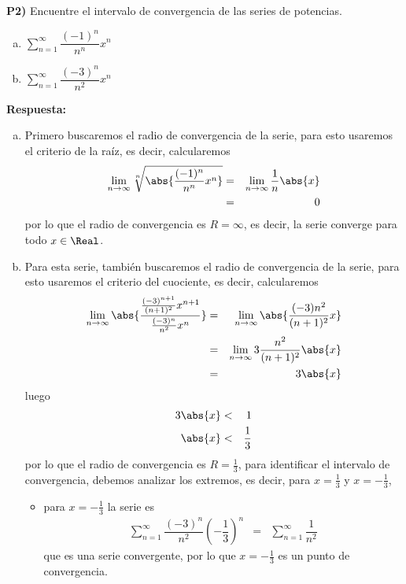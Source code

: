 \documentclass{article}
\begin{document}
\newpage
\noindent\textbf{P2) } Encuentre el intervalo de convergencia de las series de potencias.
\begin{enumerate}[a)]
  \item $\displaystyle\sum_{n=1}^{\infty}\dfrac{(-1)^n}{n^n}x^n$
  \item $\displaystyle\sum_{n=1}^{\infty}\dfrac{(-3)^n}{n^2}x^n$
\end{enumerate}

\vspace{2mm}
\noindent\textbf{Respuesta:} 
\begin{enumerate}[a)]
  \item Primero buscaremos el radio de convergencia de la serie, para esto usaremos el criterio de la raíz, es decir, calcularemos
  \begin{eqnarray*}
    \lim_{n\to\infty}\sqrt[n]{\abs{\dfrac{(-1)^n}{n^n}x^n}}
      &=& \lim_{n\to\infty}\dfrac{1}{n}\abs{x}\\
      &=& 0
  \end{eqnarray*}
  por lo que el radio de convergencia es $R=\infty$, es decir, la serie converge para todo $x\in\Real$.
  \item Para esta serie, también buscaremos el radio de convergencia de la serie, para esto usaremos el criterio del cuociente, es decir, calcularemos
  \begin{eqnarray*}
    \lim_{n\to\infty}\abs{\dfrac{\frac{(-3)^{n+1}}{(n+1)^2}x^{n+1}}{\frac{(-3)^n}{n^2}x^n}}
      &=& \lim_{n\to\infty}\abs{\dfrac{(-3)n^2}{(n+1)^2}x}\\
      &=& \lim_{n\to\infty} 3\dfrac{n^2}{(n+1)^2}\abs{x}\\
      &=& 3\abs{x}
  \end{eqnarray*}
  luego 
  \begin{eqnarray*}
    3\abs{x} &<& 1\\
    \abs{x} &<& \dfrac{1}{3}
  \end{eqnarray*}
  por lo que el radio de convergencia es $R=\frac{1}{3}$, para identificar el intervalo de convergencia, debemos analizar los extremos, es decir, para $x=\frac{1}{3}$ y $x=-\frac{1}{3}$, 
  \begin{itemize}
    \item para $x=-\frac{1}{3}$ la serie es
    \begin{eqnarray*}
      \sum_{n=1}^{\infty}\dfrac{(-3)^n}{n^2}\left(-\dfrac{1}{3}\right)^n
        &=& \sum_{n=1}^{\infty}\dfrac{1}{n^2}
    \end{eqnarray*}
    que es una serie convergente, por lo que $x=-\frac{1}{3}$ es un punto de convergencia.

\end{itemize}
\end{enumerate}
\end{document}
